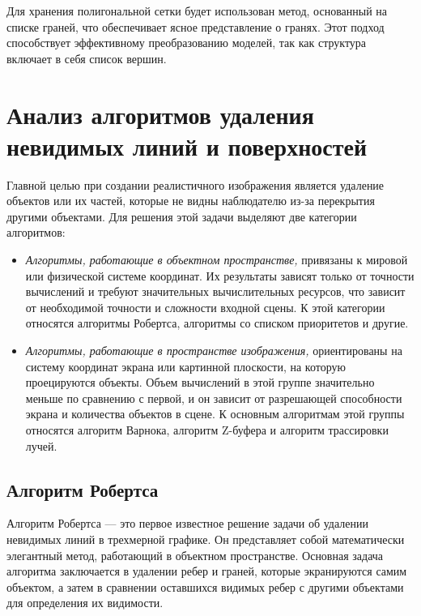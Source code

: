 Для хранения полигональной сетки будет использован метод, основанный на списке граней, что обеспечивает ясное представление о гранях. Этот подход способствует эффективному преобразованию моделей, так как структура включает в себя список вершин.

\clearpage

\section{Анализ алгоритмов удаления невидимых линий и поверхностей}

Главной целью при создании реалистичного изображения является удаление объектов или их частей, которые не видны наблюдателю из-за перекрытия другими объектами. Для решения этой задачи выделяют две категории алгоритмов:

\begin{itemize}[label=--]
	\item \textit{Алгоритмы, работающие в объектном пространстве,} привязаны к мировой или физической системе координат. Их результаты зависят только от точности вычислений и требуют значительных вычислительных ресурсов, что зависит от необходимой точности и сложности входной сцены. К этой категории относятся алгоритмы Робертса, алгоритмы со списком приоритетов и другие.
	
	\item \textit{Алгоритмы, работающие в пространстве изображения,} ориентированы на систему координат экрана или картинной плоскости, на которую проецируются объекты. Объем вычислений в этой группе значительно меньше по сравнению с первой, и он зависит от разрешающей способности экрана и количества объектов в сцене. К основным алгоритмам этой группы относятся алгоритм Варнока, алгоритм Z-буфера и алгоритм трассировки лучей.
\end{itemize}

\subsection{Алгоритм Робертса}

Алгоритм Робертса — это первое известное решение задачи об удалении невидимых линий в трехмерной графике. Он представляет собой математически элегантный метод, работающий в объектном пространстве. Основная задача алгоритма заключается в удалении ребер и граней, которые экранируются самим объектом, а затем в сравнении оставшихся видимых ребер с другими объектами для определения их видимости.

